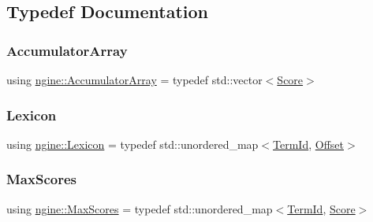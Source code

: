 \subsection{Typedef Documentation}
\mbox{\label{namespacengine_a1da6a55100934f314367b885143c56aa}} 
\subsubsection{\texorpdfstring{Accumulator\+Array}{AccumulatorArray}}
{\footnotesize\ttfamily using \hyperlink{namespacengine_a1da6a55100934f314367b885143c56aa}{ngine\+::\+Accumulator\+Array} = typedef std\+::vector$<$\hyperlink{structngine_1_1Score}{Score}$>$}

\mbox{\label{namespacengine_a97aa1030dca95ffefec4e7487a155015}} 
\subsubsection{\texorpdfstring{Lexicon}{Lexicon}}
{\footnotesize\ttfamily using \hyperlink{namespacengine_a97aa1030dca95ffefec4e7487a155015}{ngine\+::\+Lexicon} = typedef std\+::unordered\+\_\+map$<$\hyperlink{structngine_1_1TermId}{Term\+Id}, \hyperlink{structngine_1_1Offset}{Offset}$>$}

\mbox{\label{namespacengine_a92bfb5e91078f4b4dffe6f960f0f2016}} 
\subsubsection{\texorpdfstring{Max\+Scores}{MaxScores}}
{\footnotesize\ttfamily using \hyperlink{namespacengine_a92bfb5e91078f4b4dffe6f960f0f2016}{ngine\+::\+Max\+Scores} = typedef std\+::unordered\+\_\+map$<$\hyperlink{structngine_1_1TermId}{Term\+Id}, \hyperlink{structngine_1_1Score}{Score}$>$}

